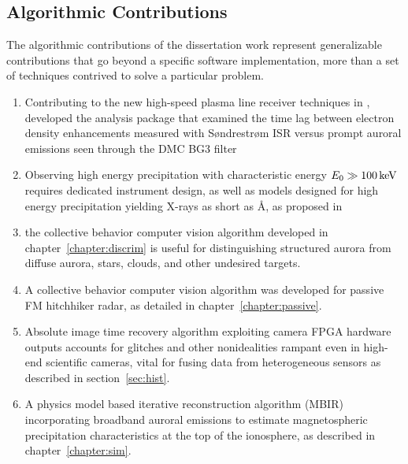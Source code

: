 \subsection{Algorithmic Contributions}
The algorithmic contributions of the dissertation work represent generalizable contributions that go beyond a specific software implementation, more than a set of techniques contrived to solve a particular problem.

\begin{enumerate}
    
   \item Contributing to the new high-speed plasma line receiver techniques in \citet{vierinen2016agu,vierinen2016,bhatt2016sondre}, developed the analysis package \citet{dmcutils} that examined the time lag between electron density enhancements measured with Søndrestrøm ISR versus prompt auroral emissions seen through the DMC BG3 filter
    
   \item Observing high energy precipitation with characteristic energy $E_0 \gg \unit[100]{keV}$ requires dedicated instrument design, as well as models \citep{glowaurora,gridaurora} designed for high energy precipitation yielding X-rays as short as \unit[20]{\AA}, as proposed in \citet{sivadas2016cedar}
  
\item the collective behavior computer vision algorithm developed in chapter~\ref{chapter:discrim} is useful for distinguishing structured aurora from diffuse aurora, stars, clouds, and other undesired targets.

\item A collective behavior computer vision algorithm was developed for passive FM hitchhiker radar, as detailed in chapter~\ref{chapter:passive}.

\item Absolute image time recovery algorithm exploiting camera FPGA hardware outputs accounts for glitches and other nonidealities rampant even in high-end scientific cameras, vital for fusing data from heterogeneous sensors as described in section~\ref{sec:hist}.

\item A physics model based iterative reconstruction algorithm (MBIR) incorporating broadband auroral emissions to estimate magnetospheric precipitation characteristics at the top of the ionosphere, as described in chapter~\ref{chapter:sim}.


\end{enumerate}
